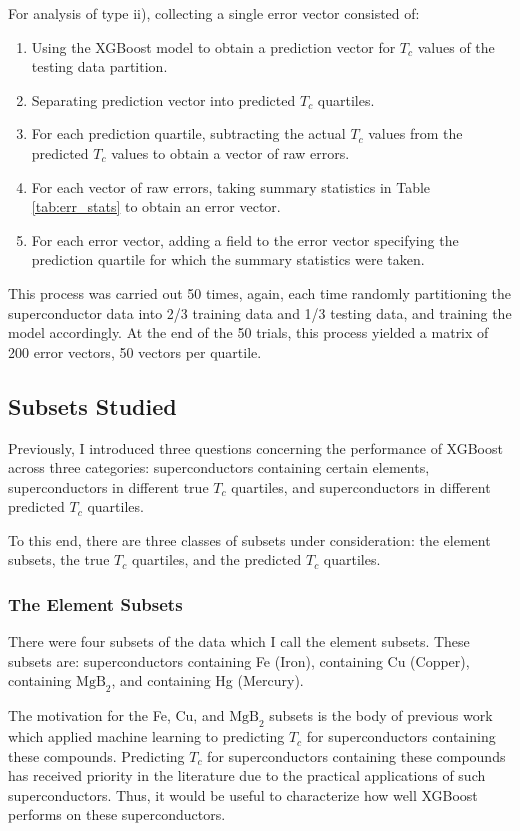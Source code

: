 \documentclass[oneside,12pt]{amsart}
\begin{document}
 For analysis of type ii), collecting a single error vector consisted of:
 \begin{enumerate}
     \item Using the XGBoost model to obtain a prediction vector for $T_c$ values of the testing data partition.
     \item Separating prediction vector into predicted $T_c$ quartiles.
     \item For each prediction quartile, subtracting the actual $T_c$ values from the predicted $T_c$ values to obtain a vector of raw errors.
     \item For each vector of raw errors, taking summary statistics in Table \ref{tab:err_stats} to obtain an error vector. 
     \item For each error vector, adding a field to the error vector specifying the prediction quartile for which the summary statistics were taken.
 \end{enumerate}
 This process was carried out 50 times, again, each time randomly partitioning the superconductor data into 2/3 training data and 1/3 testing data, and training the model accordingly. At the end of the 50 trials, this process yielded a matrix of 200 error vectors, 50 vectors per quartile.
 
 \subsection{Subsets Studied}
 Previously, I introduced three questions concerning the performance of XGBoost across three categories: superconductors containing certain elements, superconductors in different true $T_c$ quartiles, and superconductors in different predicted $T_c$ quartiles. 
 
 To this end, there are three classes of subsets under consideration: the element subsets, the true $T_c$ quartiles, and the predicted $T_c$ quartiles.
 
 \subsubsection{The Element Subsets}
 There were four subsets of the data which I call the element subsets. These subsets are: superconductors containing Fe (Iron), containing Cu (Copper), containing $\text{MgB}_2$, and containing Hg (Mercury).
 
 The motivation for the Fe, Cu, and $\text{MgB}_2$ subsets is the body of previous work which applied machine learning to predicting $T_c$ for superconductors containing these compounds. Predicting $T_c$ for superconductors containing these compounds has received priority in the literature due to the practical applications of such superconductors. Thus, it would be useful to characterize how well XGBoost performs on these superconductors.
 
\end{document}
